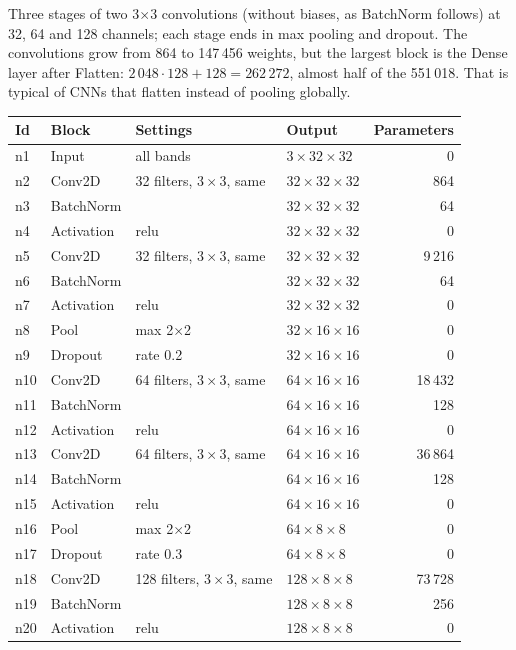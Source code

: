 Three stages of two 3$\times$3 convolutions (without biases, as BatchNorm follows) at 32, 64 and 128 channels; each stage ends in max pooling and dropout. The convolutions grow from 864 to 147\,456 weights, but the largest block is the Dense layer after Flatten: $2\,048\cdot128+128=262\,272$, almost half of the 551\,018. That is typical of CNNs that flatten instead of pooling globally.

{\small
\begin{longtable}{@{}lp{3.2cm}p{5.4cm}lr@{}}
\toprule
\textbf{Id} & \textbf{Block} & \textbf{Settings} & \textbf{Output} & \textbf{Parameters}\\
\midrule\endhead
n1 & Input & all bands & $3\times32\times32$ & 0\\
n2 & Conv2D & 32 filters, $3\times3$, same & $32\times32\times32$ & 864\\
n3 & BatchNorm &  & $32\times32\times32$ & 64\\
n4 & Activation & relu & $32\times32\times32$ & 0\\
n5 & Conv2D & 32 filters, $3\times3$, same & $32\times32\times32$ & 9\,216\\
n6 & BatchNorm &  & $32\times32\times32$ & 64\\
n7 & Activation & relu & $32\times32\times32$ & 0\\
n8 & Pool & max 2$\times$2 & $32\times16\times16$ & 0\\
n9 & Dropout & rate 0.2 & $32\times16\times16$ & 0\\
n10 & Conv2D & 64 filters, $3\times3$, same & $64\times16\times16$ & 18\,432\\
n11 & BatchNorm &  & $64\times16\times16$ & 128\\
n12 & Activation & relu & $64\times16\times16$ & 0\\
n13 & Conv2D & 64 filters, $3\times3$, same & $64\times16\times16$ & 36\,864\\
n14 & BatchNorm &  & $64\times16\times16$ & 128\\
n15 & Activation & relu & $64\times16\times16$ & 0\\
n16 & Pool & max 2$\times$2 & $64\times8\times8$ & 0\\
n17 & Dropout & rate 0.3 & $64\times8\times8$ & 0\\
n18 & Conv2D & 128 filters, $3\times3$, same & $128\times8\times8$ & 73\,728\\
n19 & BatchNorm &  & $128\times8\times8$ & 256\\
n20 & Activation & relu & $128\times8\times8$ & 0\\

\end{longtable}}
